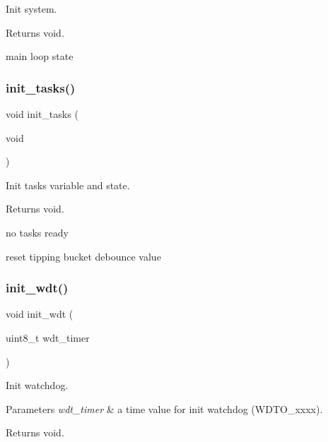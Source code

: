 Init system. 

\begin{DoxyReturn}{Returns}
void. 
\end{DoxyReturn}
main loop state \mbox{\label{i2c-rain_8ino_ab4bf0a3d77da083f131d3fa35a37d2b1}} 
\subsubsection{\texorpdfstring{init\+\_\+tasks()}{init\_tasks()}}
{\footnotesize\ttfamily void init\+\_\+tasks (\begin{DoxyParamCaption}\item[{void}]{ }\end{DoxyParamCaption})}



Init tasks variable and state. 

\begin{DoxyReturn}{Returns}
void. 
\end{DoxyReturn}
no tasks ready

reset tipping bucket debounce value \mbox{\label{i2c-rain_8ino_a980e73df66b14b1190bc25da430a4f12}} 
\subsubsection{\texorpdfstring{init\+\_\+wdt()}{init\_wdt()}}
{\footnotesize\ttfamily void init\+\_\+wdt (\begin{DoxyParamCaption}\item[{uint8\+\_\+t}]{wdt\+\_\+timer }\end{DoxyParamCaption})}



Init watchdog. 


\begin{DoxyParams}{Parameters}
{\em wdt\+\_\+timer} & a time value for init watchdog (W\+D\+T\+O\+\_\+xxxx). \\
\hline
\end{DoxyParams}
\begin{DoxyReturn}{Returns}
void. 
\end{DoxyReturn}
\mbox{\label{i2c-rain_8ino_a2441543100bf8421f56edd622a2c1d9a}} 

